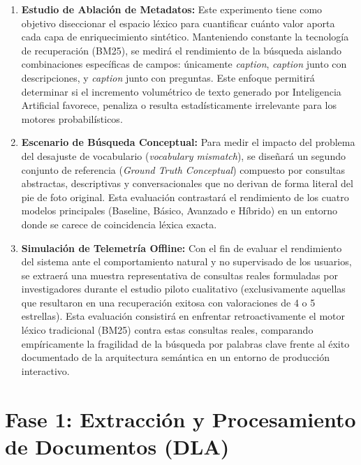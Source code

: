 \documentclass[a4paper]{report}
\begin{document}
\begin{enumerate}
    \item \textbf{Estudio de Ablación de Metadatos:} Este experimento tiene como objetivo diseccionar el espacio léxico para cuantificar cuánto valor aporta cada capa de enriquecimiento sintético. Manteniendo constante la tecnología de recuperación (BM25), se medirá el rendimiento de la búsqueda aislando combinaciones específicas de campos: únicamente \textit{caption}, \textit{caption} junto con descripciones, y \textit{caption} junto con preguntas. Este enfoque permitirá determinar si el incremento volumétrico de texto generado por Inteligencia Artificial favorece, penaliza o resulta estadísticamente irrelevante para los motores probabilísticos.
    
    \item \textbf{Escenario de Búsqueda Conceptual:} Para medir el impacto del problema del desajuste de vocabulario (\textit{vocabulary mismatch}), se diseñará un segundo conjunto de referencia (\textit{Ground Truth Conceptual}) compuesto por consultas abstractas, descriptivas y conversacionales que no derivan de forma literal del pie de foto original. Esta evaluación contrastará el rendimiento de los cuatro modelos principales (Baseline, Básico, Avanzado e Híbrido) en un entorno donde se carece de coincidencia léxica exacta.
    
    \item \textbf{Simulación de Telemetría Offline:} Con el fin de evaluar el rendimiento del sistema ante el comportamiento natural y no supervisado de los usuarios, se extraerá una muestra representativa de consultas reales formuladas por investigadores durante el estudio piloto cualitativo (exclusivamente aquellas que resultaron en una recuperación exitosa con valoraciones de 4 o 5 estrellas). Esta evaluación consistirá en enfrentar retroactivamente el motor léxico tradicional (BM25) contra estas consultas reales, comparando empíricamente la fragilidad de la búsqueda por palabras clave frente al éxito documentado de la arquitectura semántica en un entorno de producción interactivo.
\end{enumerate}

\begingroup
\let\clearpage\relax %
\let\newpage\relax   %
\vspace{0.5cm}       %

\section{Fase 1: Extracción y Procesamiento de Documentos (DLA)}
\label{sec:metodologia_dla}
\endgroup
\end{document}
